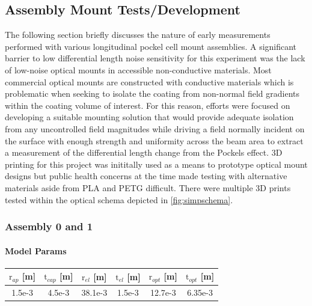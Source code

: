 \subsection{Assembly Mount Tests/Development}
The following section briefly discusses the nature of early measurements performed with various longitudinal pockel cell mount assemblies. A significant barrier to low differential length noise sensitivity for this experiment was the lack of low-noise optical mounts in accessible non-conductive materials. Most commercial optical mounts are constructed with conductive materials which is problematic when seeking to isolate the coating from non-normal field gradients within the coating volume of interest.  For this reason, efforts were focused on developing a suitable mounting solution that would provide adequate isolation from any uncontrolled field magnitudes while driving a field normally incident on the surface with enough strength and uniformity across the beam area to extract a measurement of the differential length change from the Pockels effect. 3D printing for this project was inititally used as a means to prototype optical mount designs but public health concerns at the time made testing with alternative materials aside from PLA and PETG difficult. There were multiple 3D prints tested within the optical schema depicted in \autoref{fig:simpschema}. 

\subsubsection{Assembly 0 and 1}

\paragraph*{Model Params}\label{table:assembly0and1}
\begin{center}
\begin{tabular}{ |c|c|c|c|c|c| } 
\hline
$\mathrm{r}_{ap}$ [m] &  $\mathrm{t}_{cap}$ [m] & $\mathrm{r}_{el}$ [m] & $\mathrm{t}_{el}$ [m] & $\mathrm{r}_{opt}$ [m] & $\mathrm{t}_{opt}$ [m] \\
\hline
1.5e-3 & 4.5e-3 & 38.1e-3 & 1.5e-3 & 12.7e-3 & 6.35e-3 \\ 
\hline
\end{tabular}
\end{center}

